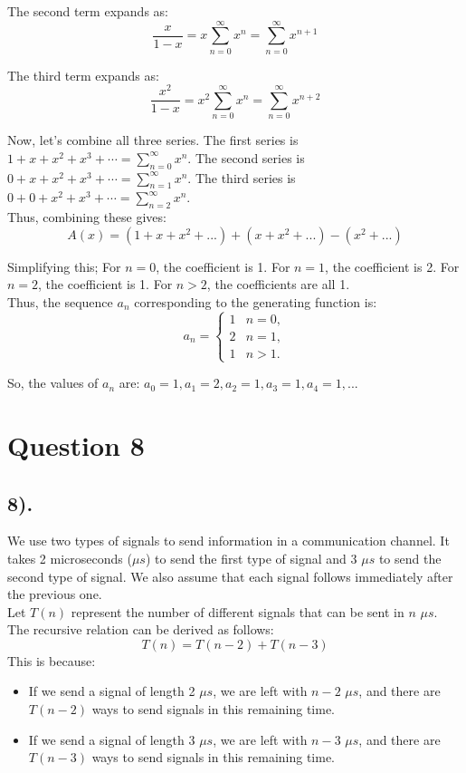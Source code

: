 \documentclass[12pt]{article}
\begin{document}
The second term expands as:
\[
\frac{x}{1 - x} = x \sum_{n=0}^{\infty} x^n = \sum_{n=0}^{\infty} x^{n+1}
\]

The third term expands as:
\[
\frac{x^2}{1 - x} = x^2 \sum_{n=0}^{\infty} x^n = \sum_{n=0}^{\infty} x^{n+2}
\]

Now, let's combine all three series.
The first series is \( 1 + x + x^2 + x^3 + \dotsb = \sum_{n=0}^{\infty} x^n \).
The second series is \( 0 + x + x^2 + x^3 + \dotsb = \sum_{n=1}^{\infty} x^n \).
The third series is \( 0 + 0 + x^2 + x^3 + \dotsb = \sum_{n=2}^{\infty} x^n \). \\

Thus, combining these gives:
\[
A(x) = (1 + x + x^2 + ...) + (x + x^2 + ...) - (x^2 + ...)
\]

Simplifying this; For \( n = 0 \), the coefficient is 1. For \( n = 1 \), the coefficient is 2. For \( n = 2 \), the coefficient is 1. For \( n > 2 \), the coefficients are all 1.\\

Thus, the sequence \(a_n\) corresponding to the generating function is:
\[
a_n =
\begin{cases}
    1 & n = 0,\\
    2 & n = 1,\\
    1 & n > 1.
\end{cases}
\]

So, the values of \(a_n\) are:
\( a_0 = 1, a_1 = 2, a_2 = 1, a_3 = 1, a_4 = 1, ... \)

\section*{Question 8}
\subsection*{8).}
We use two types of signals to send information in a communication channel. It takes 2 microseconds ($\mu s$) to send the first type of signal and 3 $\mu s$ to send the second type of signal. We also assume that each signal follows immediately after the previous one.\\

Let $T(n)$ represent the number of different signals that can be sent in $n$ $\mu s$. The recursive relation can be derived as follows:
\[
T(n) = T(n-2) + T(n-3)
\]
This is because:
\begin{itemize}
    \item If we send a signal of length 2 $\mu s$, we are left with $n - 2$ $\mu s$, and there are $T(n - 2)$ ways to send signals in this remaining time.
    \item If we send a signal of length 3 $\mu s$, we are left with $n - 3$ $\mu s$, and there are $T(n - 3)$ ways to send signals in this remaining time.
\end{itemize}
\end{document}
